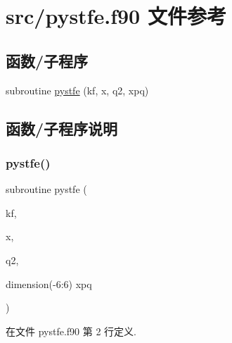 \hypertarget{pystfe_8f90}{}\section{src/pystfe.f90 文件参考}
\label{pystfe_8f90}
\subsection*{函数/子程序}
\begin{DoxyCompactItemize}
\item 
subroutine \mbox{\hyperlink{pystfe_8f90_a1cbfd2424f16fcd6b31776c29e2dcee7}{pystfe}} (kf, x, q2, xpq)
\end{DoxyCompactItemize}


\subsection{函数/子程序说明}
\mbox{\label{pystfe_8f90_a1cbfd2424f16fcd6b31776c29e2dcee7}} 
\subsubsection{\texorpdfstring{pystfe()}{pystfe()}}
{\footnotesize\ttfamily subroutine pystfe (\begin{DoxyParamCaption}\item[{}]{kf,  }\item[{}]{x,  }\item[{}]{q2,  }\item[{dimension(-\/6\+:6)}]{xpq }\end{DoxyParamCaption})}



在文件 pystfe.\+f90 第 2 行定义.

